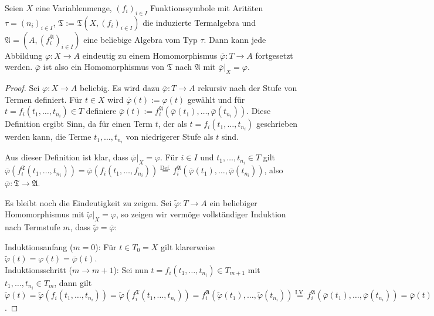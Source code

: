 \begin{theorem}\label{theorem:variablenmenge_frei}
    Seien $X$ eine Variablenmenge, $(f_i)_{i \in I}$ Funktionssymbole mit Aritäten $\tau = (n_i)_{i \in I}$, $\mathfrak{T} := \mathfrak{T}(X, (f_i)_{i \in I})$ die induzierte Termalgebra und $\mathfrak{A} = (A, (f_i^\mathfrak{A})_{i \in I})$ eine beliebige Algebra vom Typ $\tau$.
    Dann kann jede Abbildung $\varphi: X \to A$ eindeutig zu einem Homomorphismus $\overline{\varphi}: T \to A$ fortgesetzt werden. $\overline{\varphi}$ ist also ein Homomorphismus von $\mathfrak{T}$ nach $\mathfrak{A}$ mit $\overline{\varphi}\vert_X = \varphi$.
\end{theorem}
\begin{proof}
    Sei $\varphi: X \to A$ beliebig. Es wird dazu $\overline{\varphi}: T \to A$ rekursiv nach der Stufe von Termen definiert. Für $t \in X$ wird $\overline{\varphi}(t) := \varphi(t)$ gewählt und für $t = f_i(t_1, \ldots, t_{n_i}) \in T$ definiere $\overline{\varphi}(t) := f_i^\mathfrak{A}(\overline{\varphi}(t_1), \ldots, \overline{\varphi}(t_{n_i}))$. Diese Definition ergibt Sinn, da für einen Term $t$, der als $t = f_i(t_1, \ldots, t_{n_i})$ geschrieben werden kann, die Terme $t_1, \ldots, t_{n_i}$ von niedrigerer Stufe als $t$ sind.

    Aus dieser Definition ist klar, dass $\overline{\varphi} \vert_X = \varphi$. Für $i \in I$ und $t_1, \ldots, t_{n_i} \in T$ gilt $\overline{\varphi}(f_i^\mathfrak{T}(t_1, \ldots, t_{n_i})) = \overline{\varphi}(f_i(t_1, \ldots, f_{n_i})) \overset{\text{Def.}}{=} f_i^\mathfrak{A}(\overline{\varphi}(t_1), \ldots, \overline{\varphi}(t_{n_i}))$, also $\overline{\varphi} : \mathfrak{T} \to \mathfrak{A}$.

    Es bleibt noch die Eindeutigkeit zu zeigen. Sei $\widetilde{\varphi}: T \to A$ ein beliebiger Homomorphismus mit $\widetilde{\varphi}\vert_X = \varphi$, so zeigen wir vermöge vollständiger Induktion nach Termstufe $m$, dass $\widetilde{\varphi} = \overline{\varphi}$:
    
    Induktionsanfang ($m=0$): Für $t \in T_{0} = X$ gilt klarerweise $\widetilde{\varphi}(t) = \varphi(t) = \overline{\varphi}(t)$.\\
    Induktionsschritt ($m \to m+1$): Sei nun $t = f_i(t_{1}, \ldots, t_{n_i}) \in T_{m+1}$ mit $t_1, \ldots, t_{n_i} \in T_{m}$, dann gilt $\widetilde{\varphi}(t) = \widetilde{\varphi}(f_i(t_1, \ldots, t_{n_i})) = \widetilde{\varphi}(f_i^\mathfrak{T}(t_1, \ldots, t_{n_i})) = f_i^\mathfrak{A}(\widetilde{\varphi}(t_1), \ldots, \widetilde{\varphi}(t_{n_i})) \overset{\text{I.V.}}{=} f_i^\mathfrak{A}(\overline{\varphi}(t_1), \ldots, \overline{\varphi}(t_{n_i})) = \overline{\varphi}(t) $.
\end{proof}

